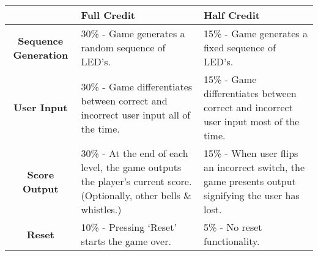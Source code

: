 \documentclass[]{article}
\begin{document}
\begin{table}[H]
\centering
\begin{tabular}{c | p{3.5cm} | p{3.5cm}}
&\textbf{Full Credit} & \textbf{Half Credit}\\\hline
\textbf{Sequence Generation}  & 30\% - Game generates a random sequence of LED's. &  15\% - Game generates a fixed sequence of LED's.  \\\hline
\textbf{User Input}  &  30\% - Game differentiates between correct and incorrect user input all of the time. & 15\% - Game differentiates between correct and incorrect user input most of the time.\\\hline
\textbf{Score Output} &  30\% - At the end of each level, the game outputs the player's current score. (Optionally, other bells \& whistles.)& 15\% - When user flips an incorrect switch, the game presents output signifying the user has lost. \\\hline
\textbf{Reset} &  10\% - Pressing `Reset' starts the game over.& 5\% - No reset functionality.\\\hline
\end{tabular}

\end{table}
\end{document}
